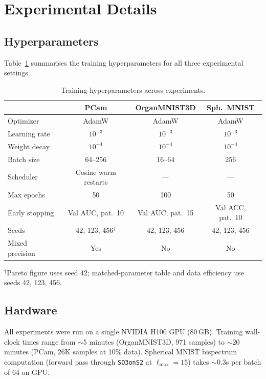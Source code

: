 \documentclass{article}
\theoremstyle{definition}
\theoremstyle{remark}
\theoremstyle{definition}
\begin{document}
\section{Experimental Details}
\label{app:exp}

\subsection{Hyperparameters}

Table~\ref{tab:hyperparams} summarises the training hyperparameters
for all three experimental settings.

\begin{table}[h]
  \caption{Training hyperparameters across experiments.}
  \label{tab:hyperparams}
  \centering
  \small
  \setlength{\tabcolsep}{4pt}
  \begin{tabular}{lccc}
    \toprule
    & PCam & OrganMNIST3D & Sph.\ MNIST \\
    \midrule
    Optimizer      & AdamW & AdamW & AdamW \\
    Learning rate  & $10^{-3}$ & $10^{-3}$ & $10^{-3}$ \\
    Weight decay   & $10^{-4}$ & $10^{-4}$ & $10^{-4}$ \\
    Batch size     & 64--256 & 16--64 & 256 \\
    Scheduler      & Cosine warm restarts & --- & --- \\
    Max epochs     & 50 & 100 & 50 \\
    Early stopping & Val AUC, pat.\ 10 & Val AUC, pat.\ 15 & Val ACC, pat.\ 10 \\
    Seeds          & 42, 123, 456$^\dagger$ & 42, 123, 456 & 42, 123, 456 \\
    Mixed precision & Yes & No & No \\
    \bottomrule
  \end{tabular}

  \vspace{0.3em}
  {\small $^\dagger$Pareto figure uses seed 42; matched-parameter table and data efficiency use seeds 42, 123, 456.}
\end{table}

\subsection{Hardware}

All experiments were run on a single NVIDIA H100 GPU (80\,GB).
Training wall-clock times range from ${\sim}$5 minutes (OrganMNIST3D,
971 samples) to ${\sim}$20 minutes (PCam, 26K samples at 10\% data).
Spherical MNIST bispectrum computation (forward pass through
\texttt{SO3onS2} at $\ell_{\max} = 15$) takes ${\sim}$0.3s per batch
of 64 on GPU.
\end{document}
